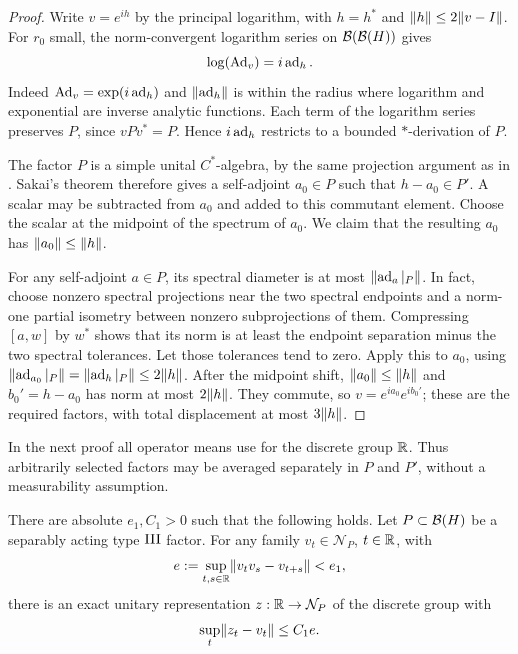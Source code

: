 \begin{proof}
Write $v=e^{ih}$ by the principal logarithm, with $h=h^*$ and
$\lVert h\rVert\le2\lVert v-I\rVert$. For $r_0$ small, the norm-convergent
logarithm series on $\mathcal B(\mathcal B(H))$ gives
\[
 \log(\operatorname{Ad}_v)=i\operatorname{ad}_h.
\]
Indeed $\operatorname{Ad}_v=\exp(i\operatorname{ad}_h)$ and $\lVert\operatorname{ad}_h\rVert$ is within the
radius where logarithm and exponential are inverse analytic
functions. Each term of the logarithm series preserves $P$,
since $vPv^*=P$. Hence $i\operatorname{ad}_h$ restricts to a bounded
$*$-derivation of $P$.

The factor $P$ is a simple unital $C^*$-algebra, by the same
projection argument as in .
Sakai's theorem therefore gives a self-adjoint $a_0\in P$ such
that $h-a_0\in P'$. A scalar may be subtracted from $a_0$ and
added to this commutant element. Choose the scalar at the midpoint
of the spectrum of $a_0$. We claim that the resulting $a_0$ has
$\lVert a_0\rVert\le\lVert h\rVert$.

For any self-adjoint $a\in P$, its spectral diameter is at most
$\lVert\operatorname{ad}_a|_P\rVert$. In fact, choose nonzero spectral projections
near the two spectral endpoints and a norm-one partial isometry
between nonzero subprojections of them. Compressing $[a,w]$ by
$w^*$ shows that its norm is at least the endpoint separation
minus the two spectral tolerances. Let those tolerances tend to
zero. Apply this to $a_0$, using
$\lVert\operatorname{ad}_{a_0}|_P\rVert=\lVert\operatorname{ad}_h|_P\rVert\le2\lVert h\rVert$.
After the midpoint shift, $\lVert a_0\rVert\le\lVert h\rVert$ and
$b_0'=h-a_0$ has norm at most $2\lVert h\rVert$.
They commute, so $v=e^{ia_0}e^{ib_0'}$; these are the required
factors, with total displacement at most $3\lVert h\rVert$.
\end{proof}

In the next proof all operator means use 
for the discrete group $\mathbb R$. Thus arbitrarily selected factors may
be averaged separately in $P$ and $P'$, without a measurability assumption.

\begin{lemma}
\label{lem:normalizer-representation-correction}
There are absolute $e_1,C_1>0$ such that the following holds.
Let $P\subset\mathcal B(H)$ be a separably acting type $\mathrm{III}$ factor.
For any family $v_t\in\mathcal N_P$, $t\in\mathbb R$, with
\[
 e:=\sup_{t,s\in\mathbb R}\lVert v_tv_s-v_{t+s}\rVert<e_1,
\]
there is an exact unitary representation $z:\mathbb R\to\mathcal N_P$
of the discrete group with
\[
 \sup_t\lVert z_t-v_t\rVert\le C_1e.
\]
\end{lemma}

